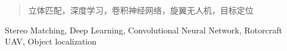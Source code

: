 \begin{abstract}  

    \begin{keywords}
        立体匹配，深度学习，卷积神经网络，旋翼无人机，目标定位 
    \end{keywords}
\end{abstract}

\begin{Abstract}

    \begin{Keywords}
        Stereo Matching, Deep Learning, Convolutional Neural Network, Rotorcraft UAV, Object localization
    \end{Keywords}
\end{Abstract}